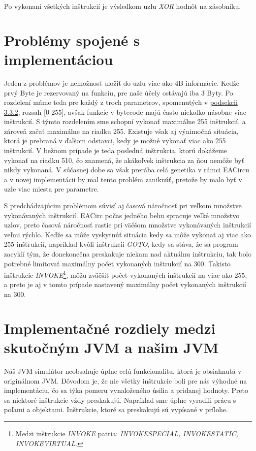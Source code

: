 Po vykonaní všetkých inštrukcií je výsledkom uzlu \textit{XOR} hodnôt na zásobníku. 

\section{Problémy spojené s implementáciou}
\label{sec:problems}

Jeden z problémov je nemožnosť uložiť do uzlu viac ako 4B informácie. Keďže prvý Byte je rezervovaný na funkciu, pre naše účely ostávajú iba 3 Byty. Po rozdelení máme teda pre každý z troch parametrov, spomenutých v \hyperref[subsec:jvm-nodes]{podsekcii 3.3.2}, rozsah [0-255], avšak funkcie v bytecode majú často niekoľko násobne viac inštrukcií. S týmto rozdelením sme schopní vykonať maximálne 255 inštrukcií, a zároveň začať maximálne na riadku 255. Existuje však aj výnimočná situácia, ktorá je prebraná v ďalšom odstavci, kedy je možné vykonať viac ako 255 inštrukcií. V bežnom prípade je teda posledná inštrukcia, ktorú dokážeme vykonať na riadku 510, čo znamená, že akákoľvek inštrukcia za ňou nemôže byť nikdy vykonaná. V súčasnej dobe sa však prerába celá genetika v rámci EACircu a v novej implementácii by mal tento problém zaniknúť, pretože by malo byť v uzle viac miesta pre parametre.

S predchádzajúcim problémom súvisí aj časová náročnosť pri veľkom množstve vykonávaných inštrukcií. EACirc počas jedného behu spracuje veľké množstvo uzlov, preto časová náročnosť rastie pri väčšom množstve vykonávaných inštrukcií veľmi rýchlo. Keďže sa môže vyskytnúť situácia kedy sa môže vykonať aj viac ako 255 inštrukcií, napríklad kvôli inštrukcii \textit{GOTO}, kedy sa stáva, že sa program zacyklí tým, že donekonečna preskakuje niekam nad aktuálnu inštrukciu, tak bolo potrebné limitovať maximálny počet vykonaných inštrukcií na 300. Takisto inštrukcie \textit{INVOKE}\footnote{Medzi inštrukcie \textit{INVOKE} patria: \textit{INVOKESPECIAL, INVOKESTATIC, INVOKEVIRTUAL}.}, môžu zväčšiť počet vykonaných inštrukcií na viac ako 255, a preto je aj v tomto prípade nastavený maximálny počet vykonaných inštrukcií na 300. 

\section{Implementačné rozdiely medzi skutočným JVM a našim JVM}
\label{sec:impl-diff}

Náš JVM simulátor neobsahuje úplne celú funkcionalitu, ktorá je obsiahnutá v originálnom JVM. Dôvodom je, že nie všetky inštrukcie boli pre nás výhodné na implementáciu, čo sa týka pomeru vynaloženého úsilia a pridanej hodnoty. Preto sa niektoré inštrukcie vždy preskakujú. Napríklad sme úplne vyradili prácu s poľami a objektami. Inštrukcie, ktoré sa preskakujú sú vypísané v prílohe.

